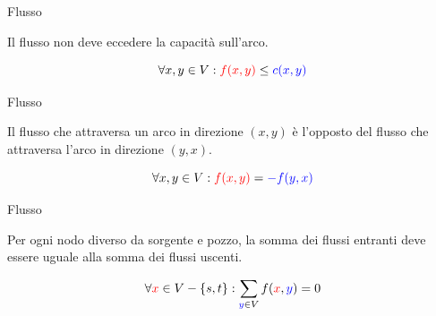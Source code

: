 \begin{frame}{Flusso}

\vspace{-9pt}
\begin{myboxtitle}
Il flusso non deve eccedere la capacità sull'arco.

\[
\forall x,y \in V: {\color{red} f(x,y)} \leq {\color{blue} c(x,y)}
\]
\end{myboxtitle}

\smallskip
\begin{center}
\end{center}

\end{frame}


\begin{frame}{Flusso}

\vspace{-9pt}
\begin{myboxtitle}
Il flusso che attraversa un arco in direzione $(x,y)$ è l'opposto del flusso che attraversa l'arco in direzione $(y,x)$.

\[
\forall x,y \in V: {\color{red} f(x,y)} = {\color{blue} -f(y,x)}
\]
\end{myboxtitle}

\smallskip
\begin{center}
\end{center}


\end{frame}

\begin{frame}{Flusso}

\vspace{-9pt}
\begin{myboxtitle}
Per ogni nodo diverso da sorgente e pozzo, la somma dei flussi entranti deve essere uguale alla somma dei flussi uscenti.

\[
\forall \textcolor{red}{x} \in V-\{s,t\}: \sum_{\textcolor{blue}{y} \in V} f(\textcolor{red}{x}, \textcolor{blue}{y}) = 0
\]
\end{myboxtitle}

\smallskip
\begin{center}
\end{center}

\end{frame}

